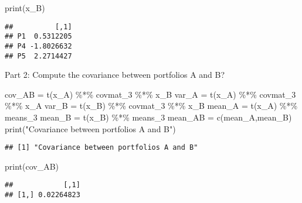 \documentclass[
]{article}
\newenvironment{Shaded}{\begin{snugshade}}{\end{snugshade}}
\newcommand{\FunctionTok}[1]{\textcolor[rgb]{0.00,0.00,0.00}{#1}}
\newcommand{\NormalTok}[1]{#1}
\newcommand{\OtherTok}[1]{\textcolor[rgb]{0.56,0.35,0.01}{#1}}
\newcommand{\SpecialCharTok}[1]{\textcolor[rgb]{0.00,0.00,0.00}{#1}}
\newcommand{\StringTok}[1]{\textcolor[rgb]{0.31,0.60,0.02}{#1}}
\begin{document}
\begin{Shaded}
\begin{Highlighting}[]
\FunctionTok{print}\NormalTok{(x\_B)}
\end{Highlighting}
\end{Shaded}

\begin{verbatim}
##          [,1]
## P1  0.5312205
## P4 -1.8026632
## P5  2.2714427
\end{verbatim}

Part 2: Compute the covariance between portfolios A and B?

\begin{Shaded}
\begin{Highlighting}[]
\NormalTok{cov\_AB }\OtherTok{=} \FunctionTok{t}\NormalTok{(x\_A) }\SpecialCharTok{\%*\%}\NormalTok{ covmat\_3 }\SpecialCharTok{\%*\%}\NormalTok{ x\_B}
\NormalTok{var\_A }\OtherTok{=} \FunctionTok{t}\NormalTok{(x\_A) }\SpecialCharTok{\%*\%}\NormalTok{ covmat\_3 }\SpecialCharTok{\%*\%}\NormalTok{ x\_A}
\NormalTok{var\_B }\OtherTok{=} \FunctionTok{t}\NormalTok{(x\_B) }\SpecialCharTok{\%*\%}\NormalTok{ covmat\_3 }\SpecialCharTok{\%*\%}\NormalTok{ x\_B}
\NormalTok{mean\_A }\OtherTok{=} \FunctionTok{t}\NormalTok{(x\_A) }\SpecialCharTok{\%*\%}\NormalTok{ means\_3}
\NormalTok{mean\_B }\OtherTok{=} \FunctionTok{t}\NormalTok{(x\_B) }\SpecialCharTok{\%*\%}\NormalTok{ means\_3}
\NormalTok{mean\_AB }\OtherTok{=} \FunctionTok{c}\NormalTok{(mean\_A,mean\_B)}
\FunctionTok{print}\NormalTok{(}\StringTok{"Covariance between portfolios A and B"}\NormalTok{)}
\end{Highlighting}
\end{Shaded}

\begin{verbatim}
## [1] "Covariance between portfolios A and B"
\end{verbatim}

\begin{Shaded}
\begin{Highlighting}[]
\FunctionTok{print}\NormalTok{(cov\_AB)}
\end{Highlighting}
\end{Shaded}

\begin{verbatim}
##            [,1]
## [1,] 0.02264823
\end{verbatim}
\end{document}
